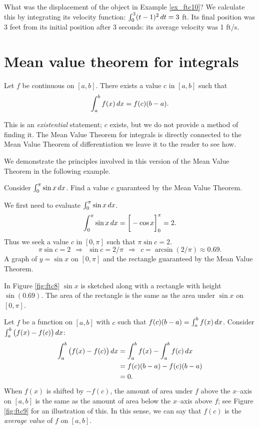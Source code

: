 \documentclass{ximera}
\begin{document}
What was the displacement of the object in Example \ref{ex_ftc10}? We
calculate this by integrating its velocity function: $\int_0^3
(t-1)^2\,d t = 3$ ft. Its final position was 3 feet from its initial
position after 3 seconds: its average velocity was 1 ft/s.





\section{Mean value theorem for integrals}


\begin{theorem}
Let $f$ be continuous on $[a,b]$. There exists a value $c$ in $[a,b]$
such that
\[
\int_a^bf(x)\,d x = f(c)(b-a).
\]
\end{theorem}


This is an \emph{existential} statement; $c$ exists, but we do not
provide a method of finding it. The Mean Value Theorem for integrals
is directly connected to the Mean Value Theorem of differentiation we
leave it to the reader to see how.

We demonstrate the principles involved in this version of the Mean
Value Theorem in the following example.

\begin{example}%
  Consider $\int_0^\pi \sin x \,d x$. Find a value $c$ guaranteed by the Mean Value Theorem.
  \begin{explanation}
    We first need to evaluate $\int_0^\pi \sin x\,d x$.
    \[
    \int_0^\pi\sin x\,d x =\bigg[ -\cos x \bigg]_0^\pi = 2.
    \]
    Thus we seek a value $c$ in $[0,\pi]$ such that $\pi\sin c =2$. 
    \[
    \pi\sin c = 2\ \ \Rightarrow\ \ \sin c = 2/\pi\ \ \Rightarrow\ \ c = \arcsin(2/\pi) \approx 0.69.
    \]
    A graph of $y=\sin x$ on $[0,\pi]$ and the rectangle guaranteed by the Mean Value Theorem.
  \end{explanation}
\end{example}
In Figure \ref{fig:ftc8} $\sin x$ is sketched along with a rectangle
with height $\sin (0.69)$. The area of the rectangle is the same as
the area under $\sin x$ on $[0,\pi]$. 

Let $f$ be a function on $[a,b]$ with $c$ such that $f(c)(b-a) =
\int_a^bf(x)\,d x$. Consider $\int_a^b\big(f(x)-f(c)\big)\,d x$:
\begin{align*}
  \int_a^b\big(f(x)-f(c)\big)\,d x &= \int_a^b f(x) - \int_a^b f(c)\,d x\\
  &= f(c)(b-a) - f(c)(b-a) \\
  &= 0.
\end{align*}
When $f(x)$ is shifted by $-f(c)$, the amount of area under $f$ above
the $x$--axis on $[a,b]$ is the same as the amount of area below the
$x$--axis above $f$; see Figure \ref{fig:ftc9} for an illustration of
this. In this sense, we can say that $f(c)$ is the \textit{average
  value} of $f$ on $[a,b]$.
\end{document}
